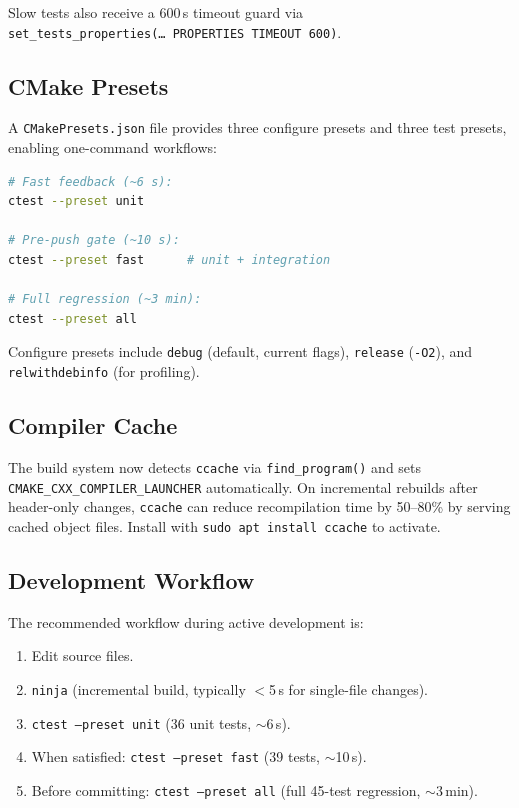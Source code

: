Slow tests also receive a 600\,s timeout guard via
\texttt{set\_tests\_properties(\ldots\ PROPERTIES TIMEOUT 600)}.

\subsection{CMake Presets}
\label{sec:cmake-presets}

A \texttt{CMakePresets.json} file provides three configure presets
and three test presets, enabling one-command workflows:

\begin{lstlisting}[language=bash,basicstyle=\small\ttfamily]
# Fast feedback (~6 s):
ctest --preset unit

# Pre-push gate (~10 s):
ctest --preset fast      # unit + integration

# Full regression (~3 min):
ctest --preset all
\end{lstlisting}

Configure presets include \texttt{debug} (default, current flags),
\texttt{release} (\texttt{-O2}), and \texttt{relwithdebinfo} (for
profiling).

\subsection{Compiler Cache}
\label{sec:ccache}

The build system now detects \texttt{ccache} via
\texttt{find\_program()} and sets
\texttt{CMAKE\_CXX\_COMPILER\_LAUNCHER} automatically.  On
incremental rebuilds after header-only changes, \texttt{ccache} can
reduce recompilation time by 50--80\% by serving cached object files.
Install with \texttt{sudo apt install ccache} to activate.

\subsection{Development Workflow}
\label{sec:dev-workflow}

The recommended workflow during active development is:

\begin{enumerate}
  \item Edit source files.
  \item \texttt{ninja} (incremental build, typically $<$5\,s for
        single-file changes).
  \item \texttt{ctest --preset unit} (36 unit tests, $\sim$6\,s).
  \item When satisfied: \texttt{ctest --preset fast} (39 tests,
        $\sim$10\,s).
  \item Before committing: \texttt{ctest --preset all} (full 45-test
        regression, $\sim$3\,min).
\end{enumerate}

